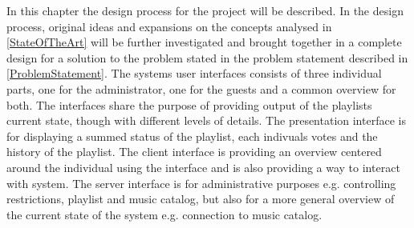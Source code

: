 In this chapter the design process for the project will be described. In the design process, original ideas and expansions on the concepts analysed in \cref{StateOfTheArt} will be further investigated and brought together in a complete design for a solution to the problem stated in the problem statement described in \cref{ProblemStatement}. The systems user interfaces consists of three individual parts, one for the administrator, one for the guests and a common overview for both. The interfaces share the purpose of providing output of the playlists current state, though with different levels of details. The presentation interface is for displaying a summed status of the playlist, each indivuals votes and the history of the playlist. The client interface is providing an overview centered around the individual using the interface and is also providing a way to interact with system. The server interface is for administrative purposes e.g. controlling restrictions, playlist and music catalog, but also for a more general overview of the current state of the system e.g. connection to music catalog.
